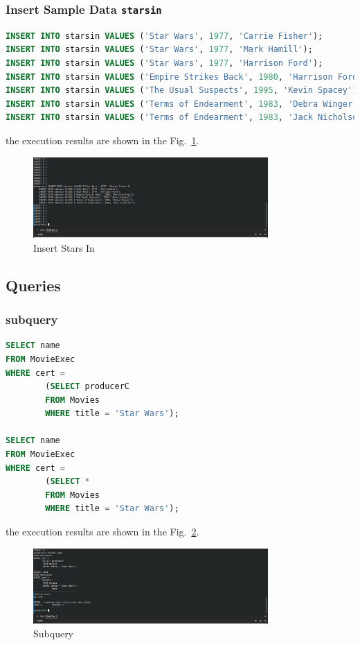 \documentclass{cshwk}
\begin{document}
\subsubsection{Insert Sample Data \texttt{starsin}}

\begin{lstlisting}[language=sql]
INSERT INTO starsin VALUES ('Star Wars', 1977, 'Carrie Fisher');
INSERT INTO starsin VALUES ('Star Wars', 1977, 'Mark Hamill');
INSERT INTO starsin VALUES ('Star Wars', 1977, 'Harrison Ford');
INSERT INTO starsin VALUES ('Empire Strikes Back', 1980, 'Harrison Ford');
INSERT INTO starsin VALUES ('The Usual Suspects', 1995, 'Kevin Spacey');
INSERT INTO starsin VALUES ('Terms of Endearment', 1983, 'Debra Winger');
INSERT INTO starsin VALUES ('Terms of Endearment', 1983, 'Jack Nicholson');
\end{lstlisting}

the execution results are shown in the Fig.~\ref{fig:insert-starsin}.

\begin{figure}[H]
    \centering
    \includegraphics[width=0.8\textwidth]{hw5-5.png}
    \caption{Insert Stars In}
    \label{fig:insert-starsin}
\end{figure}

\subsection{Queries}

\subsubsection{subquery}

\begin{lstlisting}[language=sql]
SELECT name
FROM MovieExec
WHERE cert =
        (SELECT producerC
        FROM Movies
        WHERE title = 'Star Wars');

SELECT name
FROM MovieExec
WHERE cert =
        (SELECT *
        FROM Movies
        WHERE title = 'Star Wars');
\end{lstlisting}

the execution results are shown in the Fig.~\ref{fig:subquery}.
\begin{figure}[H]
    \centering
    \includegraphics[width=0.8\textwidth]{hw5-6.png}
    \caption{Subquery}
    \label{fig:subquery}
\end{figure}
\end{document}
